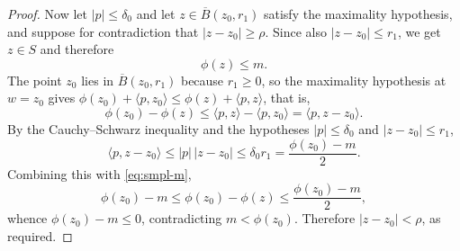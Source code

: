 \begin{proof}
Now let $|p|\le\delta_0$ and let $z\in\overline B(z_0,r_1)$ satisfy the
maximality hypothesis, and suppose for contradiction that $|z-z_0|\ge\rho$.
Since also $|z-z_0|\le r_1$, we get $z\in S$ and therefore
\begin{equation}\label{eq:smpl-m}
  \phi(z)\le m .
\end{equation}
The point $z_0$ lies in $\overline B(z_0,r_1)$ because $r_1\ge0$, so the
maximality hypothesis at $w=z_0$ gives
$\phi(z_0)+\langle p,z_0\rangle\le\phi(z)+\langle p,z\rangle$, that is,
\[
  \phi(z_0)-\phi(z)\le\langle p,z\rangle-\langle p,z_0\rangle
   =\langle p,z-z_0\rangle .
\]
By the Cauchy--Schwarz inequality and the hypotheses $|p|\le\delta_0$ and
$|z-z_0|\le r_1$,
\[
  \langle p,z-z_0\rangle\le|p|\,|z-z_0|\le\delta_0 r_1
   =\frac{\phi(z_0)-m}{2}.
\]
Combining this with \eqref{eq:smpl-m},
\[
  \phi(z_0)-m\le\phi(z_0)-\phi(z)\le\frac{\phi(z_0)-m}{2},
\]
whence $\phi(z_0)-m\le0$, contradicting $m<\phi(z_0)$. Therefore
$|z-z_0|<\rho$, as required.
\end{proof}
